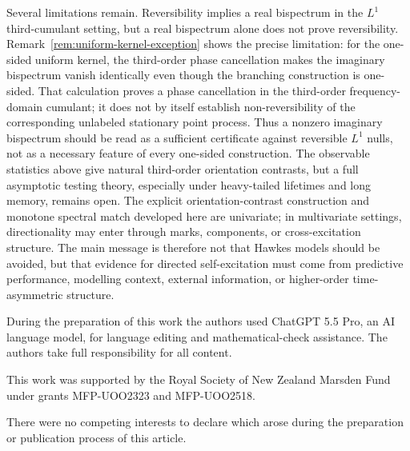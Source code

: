 \documentclass[aap,press]{apt} \volno{00} \partno{00}
\newcommand{\1}{\mathbf{1}}
\numberwithin{equation}{section}
\begin{document}
Several limitations remain. Reversibility implies a real bispectrum in the $L^1$ third-cumulant setting, but a real bispectrum alone does not prove reversibility. Remark~\ref{rem:uniform-kernel-exception} shows the precise limitation: for the one-sided uniform kernel, the third-order phase cancellation makes the imaginary bispectrum vanish identically even though the branching construction is one-sided. That calculation proves a phase cancellation in the third-order frequency-domain cumulant; it does not by itself establish non-reversibility of the corresponding unlabeled stationary point process. Thus a nonzero imaginary bispectrum should be read as a sufficient certificate against reversible $L^1$ nulls, not as a necessary feature of every one-sided construction. The observable statistics above give natural third-order orientation contrasts, but a full asymptotic testing theory, especially under heavy-tailed lifetimes and long memory, remains open. The explicit orientation-contrast construction and monotone spectral match developed here are univariate; in multivariate settings, directionality may enter through marks, components, or cross-excitation structure. The main message is therefore not that Hawkes models should be avoided, but that evidence for directed self-excitation must come from predictive performance, modelling context, external information, or higher-order time-asymmetric structure.


\acks During the preparation of this work the authors used ChatGPT 5.5 Pro, an AI language model, for language editing and mathematical-check assistance. The authors take full responsibility for all content.

\fund This work was supported by the Royal Society of New Zealand Marsden Fund under grants MFP-UOO2323 and MFP-UOO2518.

\competing There were no competing interests to declare which arose during the preparation or publication process of this article.

\end{document}
